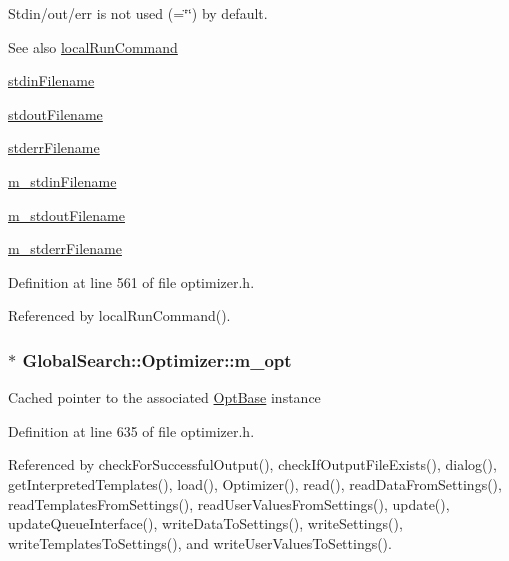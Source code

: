 Stdin/out/err is not used (=\char`\"{}\char`\"{}) by default.

\begin{DoxySeeAlso}{See also}
\hyperlink{classGlobalSearch_1_1Optimizer_aed5eb285d45a001c9520c2ed3a5b57a1}{local\+Run\+Command} 

\hyperlink{classGlobalSearch_1_1Optimizer_a5964a9b38d3ae90c8ac36a75d3a35832}{stdin\+Filename} 

\hyperlink{classGlobalSearch_1_1Optimizer_a217750aa50431f9948aa8164fb99de0c}{stdout\+Filename} 

\hyperlink{classGlobalSearch_1_1Optimizer_acaa83cc6bf1dcc263b92450b4f8cb652}{stderr\+Filename} 

\hyperlink{classGlobalSearch_1_1Optimizer_aca91d12d7aecae052d6ab5ae158acec6}{m\+\_\+stdin\+Filename} 

\hyperlink{classGlobalSearch_1_1Optimizer_a5ed04fdd5f8b511249e408adcd174550}{m\+\_\+stdout\+Filename} 

\hyperlink{classGlobalSearch_1_1Optimizer_a75b800a7f90a03d551f6795404d0c8f1}{m\+\_\+stderr\+Filename} 
\end{DoxySeeAlso}


Definition at line 561 of file optimizer.\+h.



Referenced by local\+Run\+Command().

\hypertarget{classGlobalSearch_1_1Optimizer_a689df6e2c0d8bbfff99585ca54199696}{}
\subsubsection[{m\+\_\+opt}]{$\ast$ Global\+Search\+::\+Optimizer\+::m\+\_\+opt\hspace{0.3cm}{\ttfamily [protected]}}\label{classGlobalSearch_1_1Optimizer_a689df6e2c0d8bbfff99585ca54199696}
Cached pointer to the associated \hyperlink{classGlobalSearch_1_1OptBase}{Opt\+Base} instance 

Definition at line 635 of file optimizer.\+h.



Referenced by check\+For\+Successful\+Output(), check\+If\+Output\+File\+Exists(), dialog(), get\+Interpreted\+Templates(), load(), Optimizer(), read(), read\+Data\+From\+Settings(), read\+Templates\+From\+Settings(), read\+User\+Values\+From\+Settings(), update(), update\+Queue\+Interface(), write\+Data\+To\+Settings(), write\+Settings(), write\+Templates\+To\+Settings(), and write\+User\+Values\+To\+Settings().

